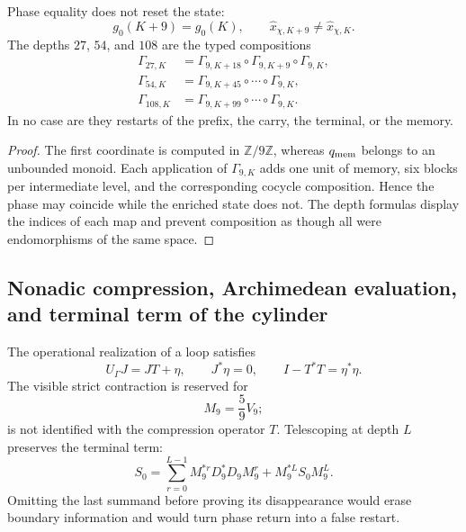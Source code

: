 \begin{theorem}
\label{gfp:b:thm:retorno-fase-conservacion-genealogica}
Phase equality does not reset the state:
\[
 g_0(K+9)=g_0(K),
 \qquad
 \widehat x_{\chi,K+9}\ne\widehat x_{\chi,K}.
\]
The depths \(27\), \(54\), and \(108\) are the typed compositions
\begin{align*}
 \Gamma_{27,K}
 &=\Gamma_{9,K+18}\circ\Gamma_{9,K+9}\circ\Gamma_{9,K},\\
 \Gamma_{54,K}
 &=\Gamma_{9,K+45}\circ\cdots\circ\Gamma_{9,K},\\
 \Gamma_{108,K}
 &=\Gamma_{9,K+99}\circ\cdots\circ\Gamma_{9,K}.
\end{align*}
In no case are they restarts of the prefix, the carry, the terminal, or the memory.
\end{theorem}

\begin{proof}
The first coordinate is computed in \(\mathbb Z/9\mathbb Z\), whereas
\(q_{\rm mem}\) belongs to an unbounded monoid. Each application of
\(\Gamma_{9,K}\) adds one unit of memory, six blocks per intermediate
level, and the corresponding cocycle composition. Hence the phase
may coincide while the enriched state does not. The depth formulas
display the indices of each map and prevent composition as though all
were endomorphisms of the same space.
\end{proof}

\subsection{Nonadic compression, Archimedean evaluation, and terminal term of the cylinder}

The operational realization of a loop satisfies
\begin{equation}
 U_\Gamma J=JT+\eta,
 \qquad
 J^*\eta=0,
 \qquad
 I-T^*T=\eta^*\eta.
 \label{gfp:b:eq:compresion-expresion-precision}
\end{equation}
The visible strict contraction is reserved for
\[
 M_9=\frac59V_9;
\]
is not identified with the compression operator \(T\). Telescoping at
depth \(L\) preserves the terminal term:
\begin{equation}
 S_0=
 \sum_{r=0}^{L-1}M_9^{*r}D_9^*D_9M_9^r
 +M_9^{*L}S_0M_9^L.
 \label{gfp:b:eq:telescopia-terminal-precision}
\end{equation}
Omitting the last summand before proving its disappearance would erase
boundary information and would turn phase return into a false
restart.

